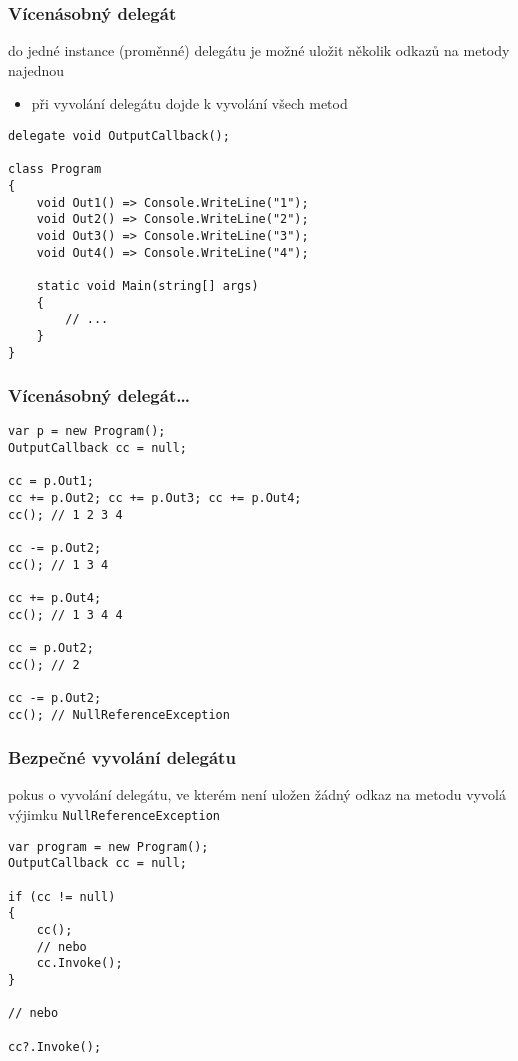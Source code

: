 \begin{frame}[fragile]
\frametitle{Vícenásobný delegát}
\vfill
\begin{bitemize}{}
\item do jedné instance (proměnné) delegátu je možné uložit několik odkazů na metody najednou
\begin{itemize}
\item při vyvolání delegátu dojde k vyvolání všech metod
\end{itemize}

\end{bitemize}
\vfill
\begin{yesblock}
\begin{lstlisting}
delegate void OutputCallback();

class Program
{
    void Out1() => Console.WriteLine("1");
    void Out2() => Console.WriteLine("2");
    void Out3() => Console.WriteLine("3");
    void Out4() => Console.WriteLine("4");

    static void Main(string[] args)
    {
        // ...
    }
}
\end{lstlisting}
\end{yesblock}
\vfill
\end{frame}




\begin{frame}[fragile]
\frametitle{Vícenásobný delegát\ldots}
\begin{yesblock}
\begin{lstlisting}
var p = new Program();
OutputCallback cc = null;

cc = p.Out1;
cc += p.Out2; cc += p.Out3; cc += p.Out4;
cc(); // 1 2 3 4

cc -= p.Out2;
cc(); // 1 3 4 

cc += p.Out4;
cc(); // 1 3 4 4

cc = p.Out2;
cc(); // 2

cc -= p.Out2;
cc(); // NullReferenceException
\end{lstlisting}
\end{yesblock}
\end{frame}




\begin{frame}[fragile]
\frametitle{Bezpečné vyvolání delegátu}
\vfill
\begin{bitemize}{}
\item pokus o vyvolání delegátu, ve kterém není uložen žádný odkaz na metodu vyvolá výjimku \lstinline|NullReferenceException|
\end{bitemize}
\vfill
\begin{yesblock}
\begin{lstlisting}
var program = new Program();
OutputCallback cc = null;

if (cc != null)
{
    cc();
    // nebo
    cc.Invoke();
}

// nebo

cc?.Invoke();
\end{lstlisting}
\end{yesblock}
\vfill
\end{frame}




